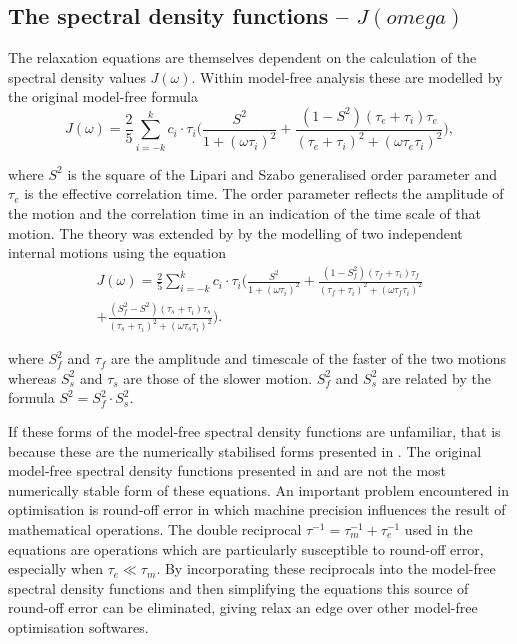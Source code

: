 \begin{htmlonly}
\begin{htmlonly}
\begin{htmlonly}
    \subsection{The spectral density functions -- $J(omega)$}
\end{htmlonly}

The relaxation equations are themselves dependent on the calculation of the spectral density values $J(\omega)$.  Within model-free analysis these are modelled by the original model-free formula \citep{LipariSzabo82a, LipariSzabo82b}
\begin{equation} \label{eq: J(w) model-free generic}
    J(\omega) = \frac{2}{5} \sum_{i=-k}^k c_i \cdot \tau_i \Bigg(
        \frac{S^2}{1 + (\omega \tau_i)^2}
        + \frac{(1 - S^2)(\tau_e + \tau_i)\tau_e}{(\tau_e + \tau_i)^2 + (\omega \tau_e \tau_i)^2}
    \Bigg),
\end{equation}

\noindent where $S^2$ is the square of the Lipari and Szabo generalised order parameter and $\tau_e$ is the effective correlation time.  The order parameter reflects the amplitude of the motion and the correlation time in an indication of the time scale of that motion.  The theory was extended by \citet{Clore90a} by the modelling of two independent internal motions using the equation
\begin{multline} \label{eq: J(w) model-free ext generic}
    J(\omega) = \frac{2}{5} \sum_{i=-k}^k c_i \cdot \tau_i \Bigg(
        \frac{S^2}{1 + (\omega \tau_i)^2}
        + \frac{(1 - S^2_f)(\tau_f + \tau_i)\tau_f}{(\tau_f + \tau_i)^2 + (\omega \tau_f \tau_i)^2}       \\
        + \frac{(S^2_f - S^2)(\tau_s + \tau_i)\tau_s}{(\tau_s + \tau_i)^2 + (\omega \tau_s \tau_i)^2}
    \Bigg).
\end{multline}

\noindent where $S^2_f$ and $\tau_f$ are the amplitude and timescale of the faster of the two motions whereas $S^2_s$ and $\tau_s$ are those of the slower motion.  $S^2_f$ and $S^2_s$ are related by the formula $S^2 = S^2_f \cdot S^2_s$.

If these forms of the model-free spectral density functions are unfamiliar, that is because these are the numerically stabilised forms presented in \citet{dAuvergneGooley08a}.  The original model-free spectral density functions presented in \citet{LipariSzabo82a} and \citet{Clore90a} are not the most numerically stable form of these equations.  An important problem encountered in optimisation is round-off error in which machine precision influences the result of mathematical operations.  The double reciprocal $\tau^{-1} = \tau_m^{-1} + \tau_e^{-1}$ used in the equations are operations which are particularly susceptible to round-off error, especially when $\tau_e \ll \tau_m$.  By incorporating these reciprocals into the model-free spectral density functions and then simplifying the equations this source of round-off error can be eliminated, giving relax an edge over other model-free optimisation softwares.



\end{htmlonly}
\end{htmlonly}
